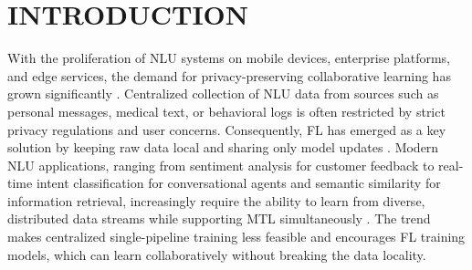 

\section{INTRODUCTION}
\label{sec:introduction}

With the proliferation of NLU systems on mobile devices, enterprise platforms, and edge services, the demand for privacy-preserving collaborative learning has grown significantly \cite{li2020challenges}. Centralized collection of NLU data from sources such as personal messages, medical text, or behavioral logs is often restricted by strict privacy regulations and user concerns. Consequently, FL has emerged as a key solution by keeping raw data local and sharing only model updates \cite{mcmahan2017fedavg}. Modern NLU applications, ranging from sentiment analysis for customer feedback to real-time intent classification for conversational agents and semantic similarity for information retrieval, increasingly require the ability to learn from diverse, distributed data streams while supporting MTL simultaneously \cite{smith2017mocha,chen2024fedbone}. The trend makes centralized single-pipeline training less feasible and encourages FL training models, which can learn collaboratively without breaking the data locality.


